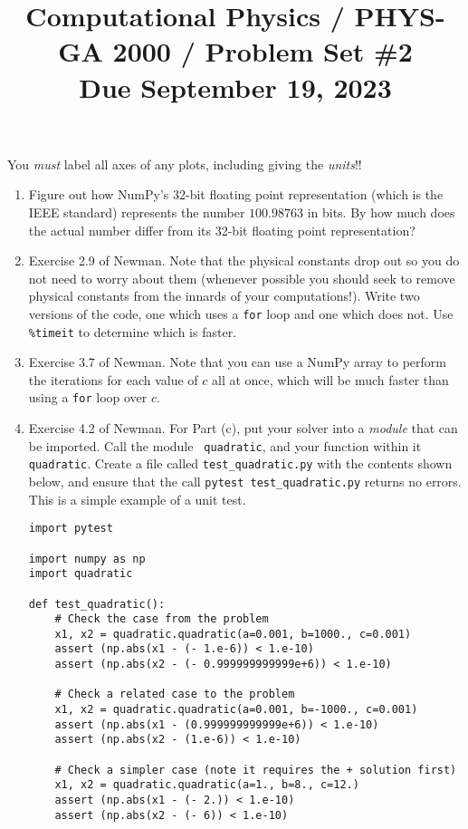 \documentclass[11pt, preprint]{aastex}
\begin{document}
\title{\bf Computational Physics / PHYS-GA 2000 / Problem Set \#2
\\ Due September 19, 2023 }

You {\it must} label all axes of any plots, including giving the {\it
  units}!!

\begin{enumerate}

  \item Figure out how NumPy's 32-bit floating point representation
    (which is the IEEE standard) represents the number $100.98763$ in
    bits. By how much does the actual number differ from its 32-bit
    floating point representation?

  \item Exercise 2.9 of Newman. Note that the physical constants drop
    out so you do not need to worry about them (whenever possible you
    should seek to remove physical constants from the innards of your
    computations!).  Write two versions of the code, one which uses a
    {\tt for} loop and one which does not.  Use {\tt \%timeit} to
    determine which is faster.

  \item Exercise 3.7 of Newman.  Note that you can use a NumPy array
    to perform the iterations for each value of $c$ all at once, which
    will be much faster than using a {\tt for} loop over $c$.

  \item Exercise 4.2 of Newman. For Part (c), put your solver into a
    {\it module} that can be imported. Call the module {\tt
      quadratic}, and your function within it {\tt quadratic}. Create
    a file called {\tt test\_quadratic.py} with the contents shown
    below, and ensure that the call {\tt pytest test\_quadratic.py}
    returns no errors. This is a simple example of a unit test.
\begin{verbatim}
import pytest

import numpy as np
import quadratic

def test_quadratic():
    # Check the case from the problem
    x1, x2 = quadratic.quadratic(a=0.001, b=1000., c=0.001)
    assert (np.abs(x1 - (- 1.e-6)) < 1.e-10)
    assert (np.abs(x2 - (- 0.999999999999e+6)) < 1.e-10)

    # Check a related case to the problem
    x1, x2 = quadratic.quadratic(a=0.001, b=-1000., c=0.001)
    assert (np.abs(x1 - (0.999999999999e+6)) < 1.e-10)
    assert (np.abs(x2 - (1.e-6)) < 1.e-10)

    # Check a simpler case (note it requires the + solution first)
    x1, x2 = quadratic.quadratic(a=1., b=8., c=12.)
    assert (np.abs(x1 - (- 2.)) < 1.e-10)
    assert (np.abs(x2 - (- 6)) < 1.e-10)
\end{verbatim}

\end{enumerate}
\end{document}
